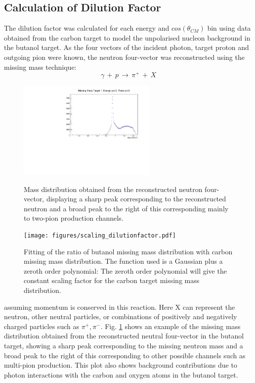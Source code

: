 \subsection{Calculation of Dilution Factor}
\label{ch:dil_factor}
The dilution factor was calculated for each energy and $cos(\theta_{CM})$ bin using data obtained from the carbon target to model the unpolarised nucleon background in the butanol target.
As the four vectors of the incident photon, target proton and outgoing pion were known, the neutron four-vector was reconstructed using the missing mass technique:
$$
\gamma \, + \,  p \, \rightarrow \, \pi^+ \, + \, X
$$
\begin{figure}[htb]
  \begin{center}
    \includegraphics[width=0.6\textwidth]{figures/neutron_missingmass.pdf} \\
    \caption{Mass distribution obtained from the reconstructed neutron four-vector, displaying a sharp peak corresponding to the reconstructed neutron and
a broad peak to the right of this corresponding mainly to two-pion production channels. }
    \label{fig:frost_neutronmissing_ex}
  \end{center}
\end{figure}
\begin{figure}[htb]
  \begin{center}
    \texttt{[image: figures/scaling\_dilutionfactor.pdf]} \\
    \caption{Fitting of the ratio of butanol missing mass distribution with carbon missing mass distribution. The function used is a Gaussian plus a zeroth order polynomial: The zeroth order polynomial will give the constant scaling factor for the carbon target missing mass distribution. }
    \label{fig:scaling_dilutionfactor}
  \end{center}
\end{figure}
assuming momentum is conserved in this reaction. Here X can represent the neutron, other neutral particles, or combinations of positively and negatively charged particles such as $\pi^+ , \pi^-$. Fig. \ref{fig:frost_neutronmissing_ex} shows an example of the missing mass distribution obtained from the reconstructed neutral four-vector in the butanol target, showing a sharp peak corresponding to the missing neutron mass and a broad peak to the right of this corresponding to other possible channels such as multi-pion production. This plot also shows background contributions due to photon interactions with the carbon and oxygen atoms in the butanol target.
